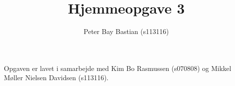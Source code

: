 \documentclass[11pt,a4paper,danish]{article}
\title{Hjemmeopgave 3}
\author{Peter Bay Bastian (s113116)}
\begin{document}
	\noindent
	Opgaven er lavet i samarbejde med Kim Bo Rasmussen (s070808) og Mikkel Møller Nielsen Davidsen (s113116).

	
	
	
	
	
\end{document}
